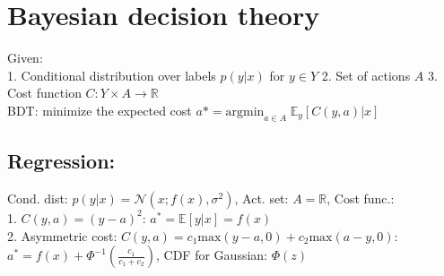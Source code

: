 \section{Bayesian decision theory}
    Given: \\
    1. Conditional distribution over labels $p(y|x)$ for $y \in Y$
    2. Set of actions $A$
    3. Cost function $C: Y \times A \rightarrow \mathbb{R}$ \\
    BDT: minimize the expected cost $a* = \mathrm{argmin}_{a \in A}\; \mathbb{E}_{y}[C(y, a)|x]$ \\

    
\subsection{ Regression: }
    Cond. dist: $p(y|x) = \mathcal{N}(x;f(x),\sigma^2)$, Act. set: $A = \mathbb{R}$, Cost func.: \\
    1. $C(y, a) = (y - a)^2$:  $a^*  =\mathbb{E}[y | x] = f(x)$ \\
    2. Asymmetric cost: $C(y, a) = c_1 \mathrm{max}(y-a, 0) +  c_2 \mathrm{max}(a-y, 0) $:  $a^* = f(x) + \Phi ^ {-1} (\frac{c_1}{c_1+c_2})$, CDF for Gaussian: $\Phi(z)$



